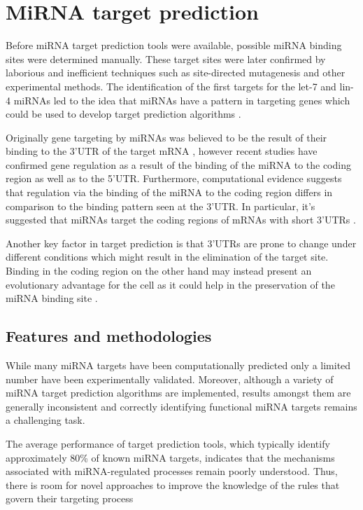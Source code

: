 \section{MiRNA target prediction}
Before miRNA target prediction tools were available, possible miRNA binding sites were
determined manually. These target sites were later confirmed by laborious and inefficient techniques such as site-directed mutagenesis and other experimental methods. The identification of the first targets for the let-7 and lin-4 miRNAs led to the idea that miRNAs have a pattern in targeting genes which could be used to develop target prediction algorithms \cite{first_predictions}.

Originally gene targeting by miRNAs was believed to be the result of their binding to the 3'UTR of the target mRNA \cite{multiple_binds}, however recent studies \cite{grosswendt} have confirmed gene regulation as a result of the binding of the miRNA to the coding region as well as to the 5'UTR. Furthermore, computational evidence suggests that regulation via the binding of the miRNA to the coding region differs in comparison to the binding pattern seen at the 3'UTR. In particular, it's suggested that miRNAs target the coding regions of mRNAs with short 3'UTRs \cite{functional_sites}.

Another key factor in target prediction is that 3'UTRs are prone to change under different conditions which might result in the elimination of the target site. Binding in the coding region on the other hand may instead present an evolutionary advantage for the cell as it could help in the preservation of the miRNA binding site \cite{mirna_targets}. 

\subsection{Features and methodologies}
While many miRNA targets have been computationally predicted only a limited number
have been experimentally validated. Moreover, although a variety of miRNA target prediction algorithms are implemented, results amongst them are generally inconsistent and correctly identifying functional miRNA targets remains a challenging task.

The average performance of target prediction tools, which typically identify approximately 80\% of known miRNA targets, indicates that the mechanisms associated with miRNA-regulated processes remain poorly understood. Thus, there is room for novel approaches to improve the knowledge of the rules that govern their targeting process \cite{targeting_rules}

